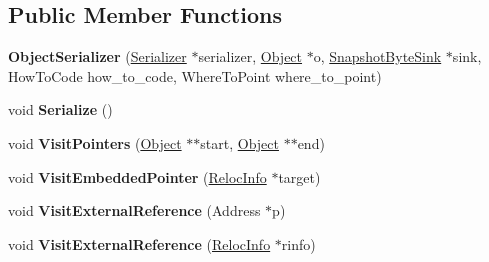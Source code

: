 \subsection*{Public Member Functions}
\begin{DoxyCompactItemize}
\item 
\hypertarget{classv8_1_1internal_1_1_serializer_1_1_object_serializer_a200eb6929b320a9dee036eb9b27372c4}{}{\bfseries Object\+Serializer} (\hyperlink{classv8_1_1internal_1_1_serializer}{Serializer} $\ast$serializer, \hyperlink{classv8_1_1internal_1_1_object}{Object} $\ast$o, \hyperlink{classv8_1_1internal_1_1_snapshot_byte_sink}{Snapshot\+Byte\+Sink} $\ast$sink, How\+To\+Code how\+\_\+to\+\_\+code, Where\+To\+Point where\+\_\+to\+\_\+point)\label{classv8_1_1internal_1_1_serializer_1_1_object_serializer_a200eb6929b320a9dee036eb9b27372c4}

\item 
\hypertarget{classv8_1_1internal_1_1_serializer_1_1_object_serializer_a828349a29e9fde5e7ddd3c32350c479a}{}void {\bfseries Serialize} ()\label{classv8_1_1internal_1_1_serializer_1_1_object_serializer_a828349a29e9fde5e7ddd3c32350c479a}

\item 
\hypertarget{classv8_1_1internal_1_1_serializer_1_1_object_serializer_a23946e6a43370fd8dddccd9c9552bd34}{}void {\bfseries Visit\+Pointers} (\hyperlink{classv8_1_1internal_1_1_object}{Object} $\ast$$\ast$start, \hyperlink{classv8_1_1internal_1_1_object}{Object} $\ast$$\ast$end)\label{classv8_1_1internal_1_1_serializer_1_1_object_serializer_a23946e6a43370fd8dddccd9c9552bd34}

\item 
\hypertarget{classv8_1_1internal_1_1_serializer_1_1_object_serializer_a211fe41087f323c9705cfe024b30fe09}{}void {\bfseries Visit\+Embedded\+Pointer} (\hyperlink{classv8_1_1internal_1_1_reloc_info}{Reloc\+Info} $\ast$target)\label{classv8_1_1internal_1_1_serializer_1_1_object_serializer_a211fe41087f323c9705cfe024b30fe09}

\item 
\hypertarget{classv8_1_1internal_1_1_serializer_1_1_object_serializer_ab1cd259710037b739109b6fa65339406}{}void {\bfseries Visit\+External\+Reference} (Address $\ast$p)\label{classv8_1_1internal_1_1_serializer_1_1_object_serializer_ab1cd259710037b739109b6fa65339406}

\item 
\hypertarget{classv8_1_1internal_1_1_serializer_1_1_object_serializer_a634f641e9b112cb4d96f26f61d02f831}{}void {\bfseries Visit\+External\+Reference} (\hyperlink{classv8_1_1internal_1_1_reloc_info}{Reloc\+Info} $\ast$rinfo)\label{classv8_1_1internal_1_1_serializer_1_1_object_serializer_a634f641e9b112cb4d96f26f61d02f831}


\end{DoxyCompactItemize}
